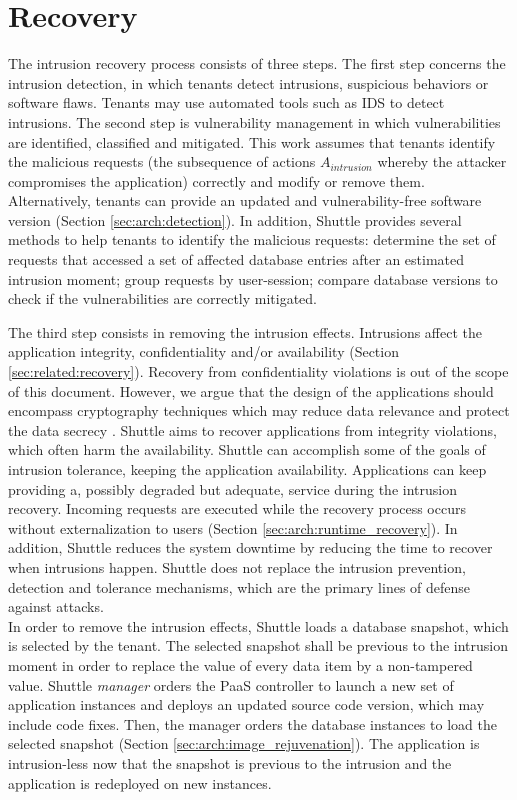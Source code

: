 \section{Recovery}
\label{sec:arch:recovery}
The intrusion recovery process consists of three steps. The first step concerns the intrusion detection, in which tenants detect intrusions, suspicious behaviors or software flaws. Tenants may use automated tools such as \ac{IDS} \cite{itdb} to detect intrusions. The second step is vulnerability management in which vulnerabilities are identified, classified and mitigated. This work assumes that tenants identify the malicious requests (the subsequence of actions $A_{intrusion}$ whereby the attacker compromises the application) correctly and modify or remove them. Alternatively, tenants can provide an updated and vulnerability-free software version (Section \ref{sec:arch:detection}).
In addition, Shuttle provides several methods to help tenants to identify the malicious requests: determine the set of requests that accessed a set of affected database entries  after an estimated intrusion moment; group requests by user-session; compare database versions to check if the vulnerabilities are correctly mitigated.

The third step consists in removing the intrusion effects. Intrusions affect the application integrity, confidentiality and/or availability (Section \ref{sec:related:recovery}). Recovery from confidentiality violations is out of the scope of this document. However, we argue that the design of the applications should encompass cryptography techniques which may reduce data relevance and protect the data secrecy \cite{Maheshwari2000}.
Shuttle aims to recover applications from integrity violations, which often harm the availability. Shuttle can accomplish some of the goals of intrusion tolerance, keeping the application availability. Applications can keep providing a, possibly degraded but adequate, service during the intrusion recovery. Incoming requests are executed while the recovery process occurs without externalization to users (Section \ref{sec:arch:runtime_recovery}). In addition, Shuttle reduces the system downtime by reducing the time to recover when intrusions happen. Shuttle does not replace the intrusion prevention, detection and tolerance mechanisms, which are the primary lines of defense against attacks.\\

In order to remove the intrusion effects, Shuttle loads a database snapshot, which is selected by the tenant. The selected snapshot shall be previous to the intrusion moment in order to replace the value of every data item by a non-tampered value. Shuttle \textit{manager} orders the \ac{PaaS} controller to launch a new set of application instances and deploys an updated source code version, which may include code fixes. Then, the manager orders the database instances to load the selected snapshot (Section \ref{sec:arch:image_rejuvenation}). The application is intrusion-less now that the snapshot is previous to the intrusion and the application is redeployed on new instances. 

